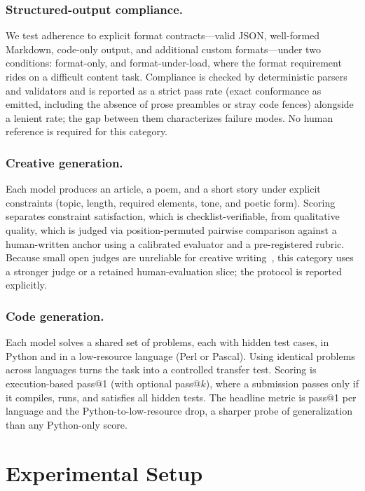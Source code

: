 \documentclass[runningheads]{llncs}
\begin{document}
\subsubsection{Structured-output compliance.}
We test adherence to explicit format contracts---valid JSON, well-formed
Markdown, code-only output, and additional custom formats---under two
conditions: format-only, and format-under-load, where the format requirement
rides on a difficult content task. Compliance is checked by deterministic
parsers and validators and is reported as a strict pass rate (exact conformance
as emitted, including the absence of prose preambles or stray code fences)
alongside a lenient rate; the gap between them characterizes failure modes. No
human reference is required for this category.

\subsubsection{Creative generation.}
Each model produces an article, a poem, and a short story under explicit
constraints (topic, length, required elements, tone, and poetic form). Scoring
separates constraint satisfaction, which is checklist-verifiable, from
qualitative quality, which is judged via position-permuted pairwise comparison
against a human-written anchor using a calibrated evaluator and a pre-registered
rubric. Because small open judges are unreliable for creative
writing~\cite{litbench2025}, this category uses a stronger judge or a retained
human-evaluation slice; the protocol is reported explicitly.

\subsubsection{Code generation.}
Each model solves a shared set of problems, each with hidden test cases, in
Python and in a low-resource language (Perl or Pascal). Using identical problems
across languages turns the task into a controlled transfer test. Scoring is
execution-based pass@1 (with optional pass@$k$), where a submission passes only
if it compiles, runs, and satisfies all hidden tests. The headline metric is
pass@1 per language and the Python-to-low-resource drop, a sharper probe of
generalization than any Python-only score.

\section{Experimental Setup}
\label{sec:setup}
\end{document}
